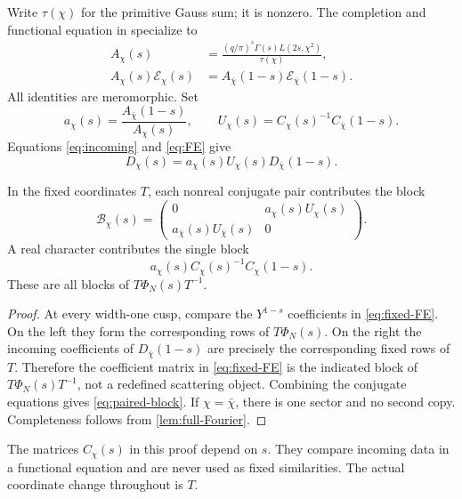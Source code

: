 Write \(\tau(\chi)\) for the primitive Gauss sum; it is nonzero.
The completion and functional equation in
\citet[completion before Proposition 4.1 and Proposition 4.2]{Young2019}
specialize to
\begin{align}
 A_\chi(s)&=\frac{(q/\pi)^s\Gamma(s)L(2s,\chi^2)}{\tau(\chi)},
 \label{eq:completion}\\
 A_\chi(s)\mathcal E_\chi(s)
 &=A_{\bar\chi}(1-s)\mathcal E_{\bar\chi}(1-s).
 \label{eq:FE}
\end{align}
All identities are meromorphic. Set
\[
 a_\chi(s)=\frac{A_{\bar\chi}(1-s)}{A_\chi(s)},\qquad
 U_\chi(s)=C_\chi(s)^{-1}C_{\bar\chi}(1-s).
\]
Equations \eqref{eq:incoming} and \eqref{eq:FE} give
\begin{equation}\label{eq:fixed-FE}
 D_\chi(s)=a_\chi(s)U_\chi(s)D_{\bar\chi}(1-s).
\end{equation}

\begin{proposition}\label{prop:paired-blocks}
In the fixed coordinates \(T\), each nonreal conjugate pair contributes
the block
\begin{equation}\label{eq:paired-block}
 \mathcal B_\chi(s)=
 \begin{pmatrix}
 0&a_\chi(s)U_\chi(s)\\
 a_{\bar\chi}(s)U_{\bar\chi}(s)&0
 \end{pmatrix}.
\end{equation}
A real character contributes the single block
\[
 a_\chi(s)C_\chi(s)^{-1}C_\chi(1-s).
\]
These are all blocks of \(T\Phi_N(s)T^{-1}\).
\end{proposition}
\begin{proof}
At every width-one cusp, compare the \(Y^{1-s}\) coefficients in
\eqref{eq:fixed-FE}. On the left they form the corresponding rows of
\(T\Phi_N(s)\). On the right the incoming coefficients of
\(D_{\bar\chi}(1-s)\) are precisely the corresponding fixed rows of
\(T\). Therefore the coefficient matrix in \eqref{eq:fixed-FE} is
the indicated block of \(T\Phi_N(s)T^{-1}\), not a redefined
scattering object. Combining the conjugate equations gives
\eqref{eq:paired-block}. If \(\chi=\bar\chi\), there is one sector
and no second copy. Completeness follows from \cref{lem:full-Fourier}.
\end{proof}

The matrices \(C_\chi(s)\) in this proof depend on \(s\). They compare
incoming data in a functional equation and are never used as fixed
similarities. The actual coordinate change throughout is \(T\).
